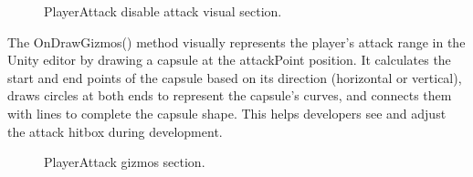 \documentclass[12pt,oneside,openright,a4paper]{cpe-english-project}
\begin{document}
 \begin{figure}[!h]
 \centering
\caption{PlayerAttack disable attack visual section.}\label{fig:disable}
\end{figure}
\newpage
The OnDrawGizmos() method visually represents the player’s attack range in the Unity editor by drawing a capsule at the attackPoint position. It calculates the start and end points of the capsule based on its direction (horizontal or vertical), draws circles at both ends to represent the capsule's curves, and connects them with lines to complete the capsule shape. This helps developers see and adjust the attack hitbox during development.
 \begin{figure}[!h]
 \centering
\caption{PlayerAttack gizmos section.}\label{fig:attkgizmos}
\end{figure}
\end{document}
